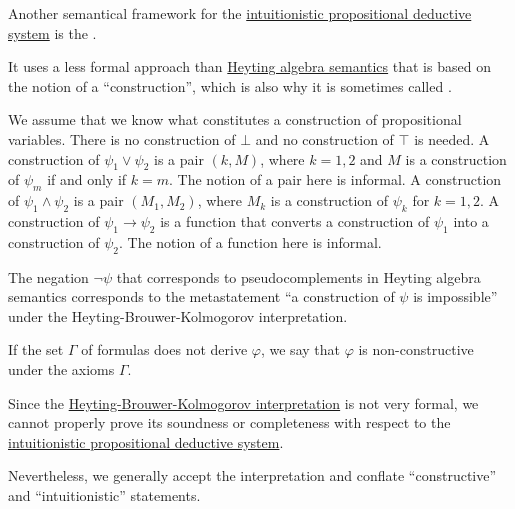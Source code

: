 \begin{remark}\label{rem:brouwer_heyting_kolmogorov_interpretation}
  Another semantical framework for the \hyperref[def:intuitionistic_propositional_deductive_systems]{intuitionistic propositional deductive system} is the .

  It uses a less formal approach than \hyperref[def:propositional_heyting_algebra_semantics]{Heyting algebra semantics} that is based on the notion of a \enquote{construction}, which is also why it is sometimes called .

  \begin{thmenum}
     We assume that we know what constitutes a construction of propositional variables.
     There is no construction of \( \bot \) and no construction of \( \top \) is needed.
     A construction of \( \psi_1 \vee \psi_2 \) is a pair \( (k, M) \), where \( k = 1, 2 \) and \( M \) is a construction of \( \psi_m \) if and only if \( k = m \). The notion of a pair here is informal.
     A construction of \( \psi_1 \wedge \psi_2 \) is a pair \( (M_1, M_2) \), where \( M_k \) is a construction of \( \psi_k \) for \( k = 1, 2 \).
     A construction of \( \psi_1 \rightarrow \psi_2 \) is a function that converts a construction of \( \psi_1 \) into a construction of \( \psi_2 \). The notion of a function here is informal.
  \end{thmenum}

  The negation \( \neg\psi \) that corresponds to pseudocomplements in Heyting algebra semantics corresponds to the metastatement \enquote{a construction of \( \psi \) is impossible} under the Heyting-Brouwer-Kolmogorov interpretation.

  If the set \( \Gamma \) of formulas does not derive \( \varphi \), we say that \( \varphi \) is non-constructive under the axioms \( \Gamma \).
\end{remark}

\begin{remark}\label{rem:brouwer_heyting_kolmogorov_interpretation_compatibility}
  Since the \hyperref[rem:brouwer_heyting_kolmogorov_interpretation]{Heyting-Brouwer-Kolmogorov interpretation} is not very formal, we cannot properly prove its soundness or completeness with respect to the \hyperref[def:intuitionistic_propositional_deductive_systems]{intuitionistic propositional deductive system}.

  Nevertheless, we generally accept the interpretation and conflate \enquote{constructive} and \enquote{intuitionistic} statements.
\end{remark}

